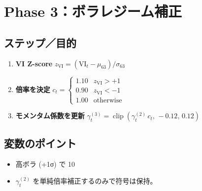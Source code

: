 
\section*{Phase 3：ボラレジーム補正}\nopagebreak[4]
\subsection*{ステップ／目的}
\begin{flushleft}
\begin{enumerate}
  \item \textbf{VI Z-score}\;
        \(z_{\text{VI}}=(\text{VI}_t-\mu_{63})/\sigma_{63}\)
  \item \textbf{倍率を決定}\;
        \(
          c_t=
          \begin{cases}
            1.10 & z_{\text{VI}}>+1\\
            0.90 & z_{\text{VI}}<-1\\
            1.00 & \text{otherwise}
          \end{cases}
        \)
  \item \textbf{モメンタム係数を更新}\;
        \( \gamma_t^{(3)}=\operatorname{clip}(
           \gamma_t^{(2)}\,c_t,\,-0.12,\,0.12) \)
\end{enumerate}
\end{flushleft}

\subsection*{変数のポイント}
\begin{flushleft}
\begin{itemize}
  \item 高ボラ (+1σ) で 10 %
  \item \(\gamma_t^{(2)}\) を単純倍率補正するのみで符号は保持。
\end{itemize}
\end{flushleft}


